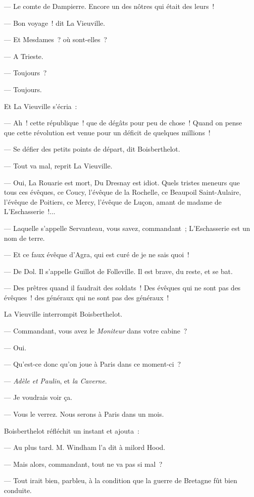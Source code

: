 \documentclass[french,twoside]{book} %
\begin{document}
— Le comte de Dampierre. Encore un des nôtres qui était des leurs !\par
— Bon voyage ! dit La Vieuville.\par
— Et Mesdames ? où sont-elles ?\par
— A Trieste.\par
— Toujours ?\par
 — Toujours.\par
Et La Vieuville s’écria :\par
— Ah ! cette république ! que de dégâts pour peu de chose ! Quand on pense que cette révolution est venue pour un déficit de quelques millions !\par
— Se défier des petits points de départ, dit Boisberthelot.\par
— Tout va mal, reprit La Vieuville.\par
— Oui, La Rouarie est mort, Du Dresnay est idiot. Quels tristes meneurs que tous ces évêques, ce Coucy, l’évêque de la Rochelle, ce Beaupoil Saint-Aulaire, l’évêque de Poitiers, ce Mercy, l’évêque de Luçon, amant de madame de L’Eschasserie !...\par
— Laquelle s’appelle Servanteau, vous savez, commandant ; L’Eschasserie est un nom de terre.\par
— Et ce faux évêque d’Agra, qui est curé de je ne sais quoi !\par
— De Dol. Il s’appelle Guillot de Folleville. Il est brave, du reste, et se bat.\par
— Des prêtres quand il faudrait des soldats ! Des évêques qui ne sont pas des évêques ! des généraux qui ne sont pas des généraux !\par
La Vieuville interrompit Boisberthelot.\par
— Commandant, vous avez le \emph{Moniteur} dans votre cabine ?\par
— Oui.\par
— Qu’est-ce donc qu’on joue à Paris dans ce moment-ci ?\par
— \emph{Adèle et Paulin}, et \emph{la Caverne}.\par
— Je voudrais voir ça.\par
 — Vous le verrez. Nous serons à Paris dans un mois.\par
Boisberthelot réfléchit un instant et ajouta :\par
— Au plus tard. M. Windham l’a dit à milord Hood.\par
— Mais alors, commandant, tout ne va pas si mal ?\par
— Tout irait bien, parbleu, à la condition que la guerre de Bretagne fût bien conduite.\par
\end{document}
